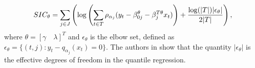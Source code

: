  \begin{equation} 
\small
SIC_\theta = \sum_{j \in J} \left( \log \left(\sum_{t \in T}\rho_{\alpha_j}(y_t - \beta_{0j}^\theta - \beta_j^{T\theta} x_t) \right) +  \frac{\log(|T|)|\epsilon_\theta|}{2|T|}  \right),\label{eq:SIC}
\end{equation}
where $\theta = [\gamma \quad \lambda]^T$ and $\epsilon_\theta$ is the elbow set, defined as $\epsilon_\theta = \{(t,j): y_t - q_{\alpha_j}(x_t) = 0 \}$. The authors in \cite{li_l1-norm_2008} show that the quantity $|\epsilon_\theta|$ is the effective degrees of freedom in the quantile regression.







